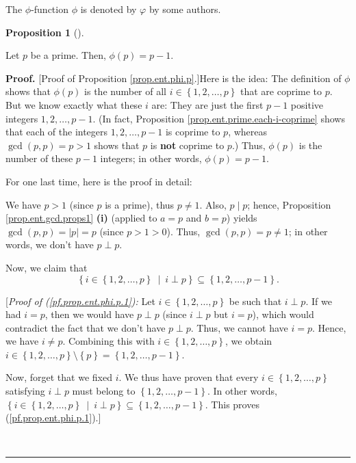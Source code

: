 \documentclass[numbers=enddot,12pt,final,onecolumn,notitlepage]{scrartcl}%
\numberwithin{exer}{subsection}
\theoremstyle{definition}
\newtheorem{prop}[theo]{Proposition}
\newenvironment{proposition}[1][]
{\begin{prop}[#1]\begin{leftbar}}
{\end{leftbar}\end{prop}}
\newenvironment{fineprint}{\begin{small}}{\end{small}}
\newenvironment{proof}[1][Proof]{\noindent\textbf{#1.} }{\ \rule{0.5em}{0.5em}}
\begin{document}
The $\phi$-function $\phi$ is denoted by $\varphi$ by some authors.

\begin{proposition}
\label{prop.ent.phi.p}Let $p$ be a prime. Then, $\phi\left(  p\right)  =p-1$.
\end{proposition}

\begin{proof}
[Proof of Proposition \ref{prop.ent.phi.p}.]Here is the idea: The definition
of $\phi$ shows that $\phi\left(  p\right)  $ is the number of all
$i\in\left\{  1,2,\ldots,p\right\}  $ that are coprime to $p$. But we know
exactly what these $i$ are: They are just the first $p-1$ positive integers
$1,2,\ldots,p-1$. (In fact, Proposition \ref{prop.ent.prime.each-i-coprime}
shows that each of the integers $1,2,\ldots,p-1$ is coprime to $p$, whereas
$\gcd\left(  p,p\right)  =p>1$ shows that $p$ is \textbf{not} coprime to $p$.)
Thus, $\phi\left(  p\right)  $ is the number of these $p-1$ integers; in other
words, $\phi\left(  p\right)  =p-1$.

\begin{fineprint}
For one last time, here is the proof in detail:

We have $p>1$ (since $p$ is a prime), thus $p\neq1$. Also, $p\mid p$; hence,
Proposition \ref{prop.ent.gcd.props1} \textbf{(i)} (applied to $a=p$ and
$b=p$) yields $\gcd\left(  p,p\right)  =\left\vert p\right\vert =p$ (since
$p>1>0$). Thus, $\gcd\left(  p,p\right)  =p\neq1$; in other words, we don't
have $p\perp p$.

Now, we claim that%
\begin{equation}
\left\{  i\in\left\{  1,2,\ldots,p\right\}  \ \mid\ i\perp p\right\}
\subseteq\left\{  1,2,\ldots,p-1\right\}  . \label{pf.prop.ent.phi.p.1}%
\end{equation}


[\textit{Proof of (\ref{pf.prop.ent.phi.p.1}):} Let $i\in\left\{
1,2,\ldots,p\right\}  $ be such that $i\perp p$. If we had $i=p$, then we
would have $p\perp p$ (since $i\perp p$ but $i=p$), which would contradict the
fact that we don't have $p\perp p$. Thus, we cannot have $i=p$. Hence, we have
$i\neq p$. Combining this with $i\in\left\{  1,2,\ldots,p\right\}  $, we
obtain $i\in\left\{  1,2,\ldots,p\right\}  \setminus\left\{  p\right\}
=\left\{  1,2,\ldots,p-1\right\}  $.

Now, forget that we fixed $i$. We thus have proven that every $i\in\left\{
1,2,\ldots,p\right\}  $ satisfying $i\perp p$ must belong to $\left\{
1,2,\ldots,p-1\right\}  $. In other words, $\left\{  i\in\left\{
1,2,\ldots,p\right\}  \ \mid\ i\perp p\right\}  \subseteq\left\{
1,2,\ldots,p-1\right\}  $. This proves (\ref{pf.prop.ent.phi.p.1}).]


\end{fineprint}
\end{proof}
\end{document}
